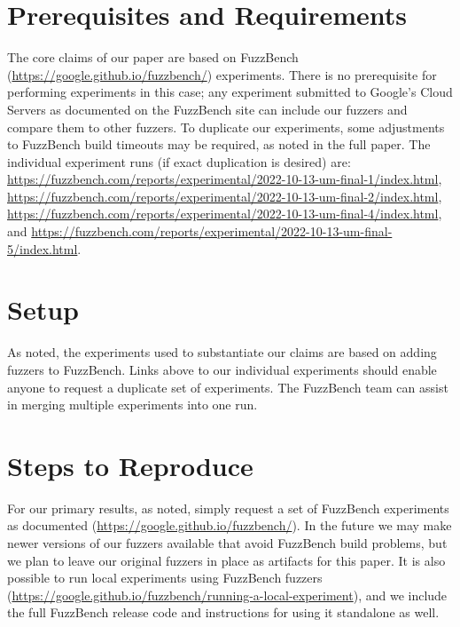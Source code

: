 \documentclass[manuscript,screen,review]{acmart}
\begin{document}
\section{Prerequisites and Requirements}


The core claims of our paper are based on FuzzBench
\cite{metzman2021fuzzbench}
(\url{https://google.github.io/fuzzbench/}) experiments.  There is no
prerequisite for performing experiments in this case; any experiment
submitted to Google's Cloud Servers as documented on the FuzzBench site
can include our fuzzers and compare them to other fuzzers.
To duplicate our experiments, some adjustments to FuzzBench build
timeouts may be required, as noted in the full paper.  The individual experiment
runs (if exact duplication is desired) are: \url{https://fuzzbench.com/reports/experimental/2022-10-13-um-final-1/index.html}, \url{https://fuzzbench.com/reports/experimental/2022-10-13-um-final-2/index.html}, \url{https://fuzzbench.com/reports/experimental/2022-10-13-um-final-4/index.html}, and \url{https://fuzzbench.com/reports/experimental/2022-10-13-um-final-5/index.html}.

\section{Setup}

As noted, the experiments used to substantiate our claims are based on
adding fuzzers to FuzzBench.  Links above to our individual
experiments should enable anyone to request a duplicate set of
experiments.  The FuzzBench team can assist in merging multiple
experiments into one run.

\section{Steps to Reproduce}

For our primary results, as noted, simply request a set of FuzzBench
experiments as documented
(\url{https://google.github.io/fuzzbench/}).  In the future we may
make newer versions of our fuzzers available that avoid FuzzBench
build problems, but we plan to leave our original fuzzers in place as
artifacts for this paper.  It is also possible to run local
experiments using FuzzBench fuzzers
(\url{https://google.github.io/fuzzbench/running-a-local-experiment}),
and we include the full FuzzBench release code and instructions for
using it standalone as well.




\end{document}
